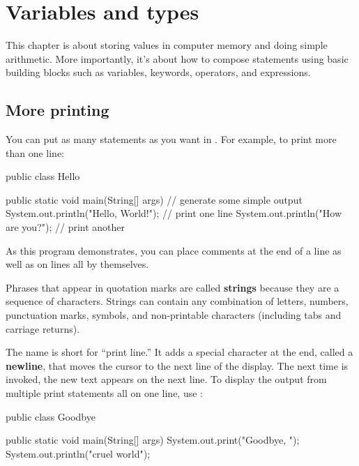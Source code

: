 \chapter{Variables and types}

This chapter is about storing values in computer memory and doing simple arithmetic.
More importantly, it's about how to compose statements using basic building blocks such as variables, keywords, operators, and expressions.


\section{More printing}

You can put as many statements as you want in .
For example, to print more than one line:

\begin{code}
public class Hello {

    public static void main(String[] args) {
        // generate some simple output
        System.out.println("Hello, World!");  // print one line
        System.out.println("How are you?");   // print another
    }

}
\end{code}

As this program demonstrates, you can place comments at the end of a line as well as on lines all by themselves.


Phrases that appear in quotation marks are called {\bf strings} because they are a sequence of characters.
Strings can contain any combination of letters, numbers, punctuation marks, symbols, and non-printable characters (including tabs and carriage returns).


The name  is short for ``print line.''
It adds a special character at the end, called a {\bf newline}, that moves the cursor to the next line of the display.
The next time  is invoked, the new text appears on the next line.
To display the output from multiple print statements all on one line, use :

\begin{code}
public class Goodbye {

    public static void main(String[] args) {
        System.out.print("Goodbye, ");
        System.out.println("cruel world");
    }

}
\end{code}

